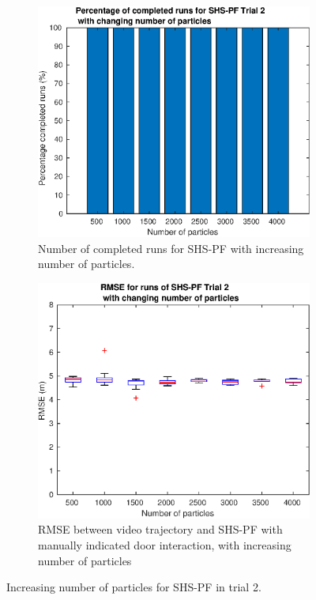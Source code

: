 \begin{figure}[H]
	\centering
	\begin{subfigure}[t]{.4\textwidth}
		\centering
		\includegraphics[width=\linewidth]{images/20201129_1147_Trial_2_nr_particles_1}
		\caption{Number of completed runs for SHS-PF with increasing number of particles.}
		\label{fig:trial2_nr_particles_completed}
	\end{subfigure} \quad
	\begin{subfigure}[t]{.4\textwidth}
		\centering
		\includegraphics[width=\linewidth]{images/20201129_1154_Trial_2_RMSE_nr_particles_1}
		\caption{RMSE between video trajectory and SHS-PF with manually indicated door interaction, with increasing number of particles}
		\label{fig:trial2_nr_particles_RMSE}
	\end{subfigure}
	\label{fig:trial2_nr_particles}
	\caption{Increasing number of particles for SHS-PF in trial 2.}
\end{figure}

